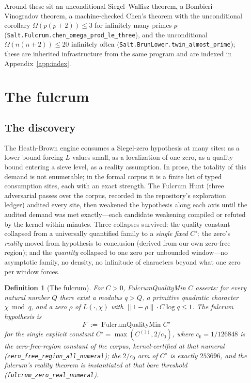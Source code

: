 \documentclass{CUP-JNL-FMP}
\newcommand{\leanname}[1]{\par\noindent{\small\texttt{#1}}}
\newcommand{\leaninline}[1]{{\small\texttt{#1}}}
\newtheorem{definition}[theorem]{Definition}
\theoremstyle{remark}
\begin{document}
Around these sit an unconditional Siegel--Walfisz theorem, a
Bombieri--Vinogradov theorem, a machine-checked Chen's theorem with the
unconditional corollary $\Omega(p(p+2)) \le 3$ for infinitely many primes
$p$ (\leaninline{Salt.Fulcrum.chen\_omega\_prod\_le\_three}), and the
unconditional $\Omega(n(n+2)) \le 20$ infinitely often
(\leaninline{Salt.BrunLower.twin\_almost\_prime}); these are inherited
infrastructure from the same program and are indexed in
Appendix~\ref{app:index}.

\section{The fulcrum}\label{sec:fulcrum}

\subsection{The discovery}
The Heath-Brown engine \cite{HB1983} consumes a Siegel-zero hypothesis at many
sites: as a lower bound forcing $L$-values small, as a localization of one
zero, as a quality bound entering a sieve level, as a reality assumption.
In prose, the totality of this demand is not enumerable; in the formal
corpus it is a finite list of typed consumption sites, each with an exact
strength. The Fulcrum Hunt (three adversarial passes over the corpus,
recorded in the repository's exploration ledger) audited every site,
then weakened the hypothesis along each axis until the audited demand was
met exactly---each candidate weakening compiled or refuted by the kernel
within minutes. Three collapses survived: the quality constant collapsed
from a universally quantified family to a \emph{single fixed} $C^\star$;
the zero's \emph{reality} moved from hypothesis to conclusion (derived
from our own zero-free region); and the \emph{quantity} collapsed to one
zero per unbounded window---no asymptotic family, no density, no
infinitude of characters beyond what one zero per window forces.

\begin{definition}[The fulcrum]\label{def:fulcrum}
For $C > 0$, \emph{FulcrumQualityMin} $C$ asserts: for every natural
number $Q$ there exist a modulus $q > Q$, a primitive quadratic
character $\chi \bmod q$, and a zero $\rho$ of $L(\cdot,\chi)$ with
$\|1-\rho\| \cdot C \log q \le 1$.
The \emph{fulcrum hypothesis} is
\[
F \;:=\; \text{FulcrumQualityMin } C^\star
\]
for the single explicit constant $C^\star = \max(C^{(1)}, 2/c_0)$, where
$c_0 = 1/126848$ is the zero-free-region constant of the corpus,
kernel-certified at that numeral
(\leaninline{zero\_free\_region\_all\_numeral}); the $2/c_0$ arm of
$C^\star$ is exactly $253696$, and the fulcrum's reality theorem is
instantiated at that bare threshold
(\leaninline{fulcrum\_zero\_real\_numeral}).
\leanname{Salt.Fulcrum.FulcrumQualityMin}
\end{definition}
\end{document}
